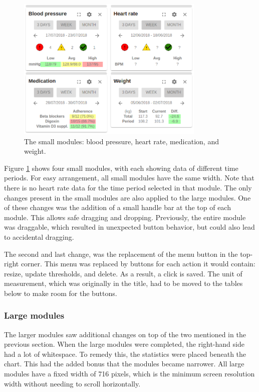         \begin{figure}[!t]
            \centering
            \includegraphics[width=0.8\textwidth]{screenshots/mods_small}
            \caption{The small modules: blood pressure, heart rate, medication, and weight.}\label{fig:screen_mods_small}
        \end{figure}

        Figure \ref{fig:screen_mods_small} shows four small modules, with each showing data of different time periods. For easy arrangement, all small modules have the same width. Note that there is no heart rate data for the time period selected in that module. The only changes present in the small modules are also applied to the large modules. One of these changes was the addition of a small handle bar at the top of each module. This allows safe dragging and dropping. Previously, the entire module was draggable, which resulted in unexpected button behavior, but could also lead to accidental dragging.

        The second and last change, was the replacement of the menu button in the top-right corner. This menu was replaced by buttons for each action it would contain: resize, update thresholds, and delete. As a result, a click is saved. The unit of measurement, which was originally in the title, had to be moved to the tables below to make room for the buttons.

        \subsubsection{Large modules}

        The larger modules saw additional changes on top of the two mentioned in the previous section. When the large modules were completed, the right-hand side had a lot of whitespace. To remedy this, the statistics were placed beneath the chart. This had the added bonus that the modules became narrower. All large modules have a fixed width of 716 pixels, which is the minimum screen resolution width without needing to scroll horizontally.

